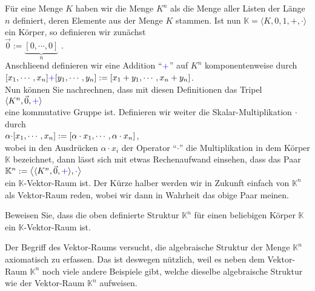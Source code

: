 \example
F\"{u}r eine Menge $K$ haben wir die Menge $K^n$ als die Menge aller Listen der L\"{a}nge $n$ definiert,
deren Elemente aus der Menge $K$ stammen.  Ist nun $\mathbb{K} = \langle K, 0, 1, +, \cdot\rangle$
ein K\"{o}rper, so definieren wir zun\"{a}chst
\\[0.2cm]
\hspace*{1.3cm}
$\vec{0} := \underbrace{[0, \cdots, 0]}_n$ .
\\[0.2cm]
Anschlie\3end definieren wir eine Addition ``${\color{blue}{+}}$'' auf $K^n$ komponentenweise durch
\\[0.2cm]
\hspace*{1.3cm}
$[x_1, \cdots, x_n] {\color{blue}{+}} [y_1, \cdots, y_n] := [x_1 + y_1, \cdots, x_n + y_n]$.
\\[0.2cm]
Nun k\"{o}nnen Sie nachrechnen, dass mit diesen Definitionen das Tripel
\\[0.2cm]
\hspace*{1.3cm}
$\langle K^n, \vec{0}, {\color{blue}+}\rangle$
\\[0.2cm]
eine kommutative Gruppe ist.  Definieren wir weiter die Skalar-Multiplikation
${\color{blue}\cdot}$ durch
\\[0.2cm]
\hspace*{1.3cm}
$\alpha {\color{blue}{\cdot}} [x_1, \cdots, x_n] := [\alpha \cdot x_1, \cdots, \alpha \cdot x_n]$,
\\[0.2cm]
wobei in den Ausdr\"{u}cken $\alpha \cdot x_i$ der Operator ``$\cdot$'' die Multiplikation in dem K\"{o}rper $\mathbb{K}$ bezeichnet,
dann l\"{a}sst sich mit etwas Rechenaufwand einsehen, dass das Paar
\\[0.2cm]
\hspace*{1.3cm}
$\mathbb{K}^n := \bigl\langle \langle K^n, \vec{0}, {\color{blue}{+}} \rangle, {\color{blue}{\cdot}} \bigr\rangle$ 
\\[0.2cm]
ein $\mathbb{K}$-Vektor-Raum ist.  Der K\"{u}rze halber werden wir in Zukunft einfach von $\mathbb{K}^n$ als Vektor-Raum reden, wobei wir dann in Wahrheit das obige Paar meinen. 
\eoxs

\exerciseStar
Beweisen Sie, dass die oben definierte Struktur $\mathbb{K}^n$ f\"{u}r einen beliebigen K\"{o}rper
$\mathbb{K}$ ein $\mathbb{K}$-Vektor-Raum ist. \eox 


Der Begriff des Vektor-Raums versucht, die algebraische Struktur der Menge $\mathbb{K}^n$
axiomatisch zu erfassen.  Das ist deswegen n\"{u}tzlich, weil es neben dem Vektor-Raum 
$\mathbb{K}^n$ noch viele andere Beispiele gibt, welche dieselbe algebraische
Struktur wie der Vektor-Raum $\mathbb{K}^n$ aufweisen.  


